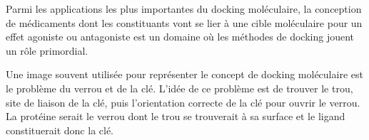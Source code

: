 Parmi les applications les plus importantes du docking moléculaire, la conception de médicaments dont les constituants vont se lier à une cible moléculaire pour un effet agoniste ou antagoniste est un domaine où les méthodes de docking jouent un rôle primordial.

Une image souvent utilisée pour représenter le concept de docking moléculaire est le problème du verrou et de la clé. L'idée de ce problème est de trouver le trou, site de liaison de la clé, puis l'orientation correcte de la clé pour ouvrir le verrou. La protéine serait le verrou dont le trou se trouverait à sa surface et le ligand constituerait donc la clé.


